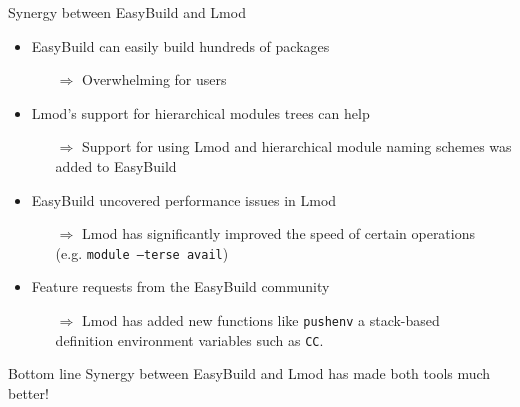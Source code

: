 \documentclass[10pt,xcolor={usenames,dvipsnames}]{beamer}
\begin{document}
\begin{frame}{Synergy between EasyBuild and Lmod}
\begin{itemize}
    \item
        EasyBuild can easily build hundreds of packages
        \begin{itemize}
            \item[$\Rightarrow$]
                Overwhelming for users
        \end{itemize}
    \item
        Lmod's support for hierarchical modules trees can help
        \begin{itemize}
            \item[$\Rightarrow$]
                Support for using Lmod and hierarchical module naming schemes
                was added to EasyBuild
        \end{itemize}
    \item
        EasyBuild uncovered performance issues in Lmod
        \begin{itemize}
            \item[$\Rightarrow$]
                Lmod has significantly improved the speed of certain operations \\
                (e.g. \texttt{module --terse avail})
        \end{itemize}
    \item
        Feature requests from the EasyBuild community
        \begin{itemize}
            \item[$\Rightarrow$]
                Lmod has added new functions like \texttt{pushenv} a stack-based \\
                definition environment variables such as \texttt{CC}.
        \end{itemize}
\end{itemize}

\medskip\quad\quad
\begin{minipage}{0.9\textwidth}
    \begin{block}{Bottom line}
        Synergy between EasyBuild and Lmod has made both tools much better!
    \end{block}
\end{minipage}
\end{frame}

\end{document}
